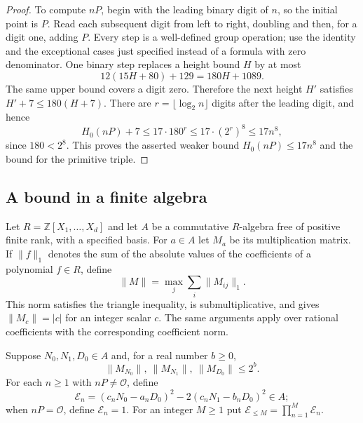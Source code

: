 \begin{proof}
To compute $nP$, begin with the leading binary digit of $n$, so the
initial point is $P$.  Read each subsequent digit from left to right,
doubling and then, for a digit one, adding $P$.  Every step is a
well-defined group operation; use the identity and the exceptional
cases just specified instead of a formula with zero denominator.
One binary step replaces a height bound $H$ by at most
\[
                     12(15H+80)+129=180H+1089.
\]
The same upper bound covers a digit zero.  Therefore the next height
$H'$ satisfies $H'+7\le180(H+7)$.  There are
$r=\lfloor\log_2 n\rfloor$ digits after the leading digit, and hence
\[
 H_0(nP)+7\le17\cdot180^r
       \le17\cdot(2^r)^8\le17n^8,
\]
since $180<2^8$.  This proves the asserted weaker bound
$H_0(nP)\le17n^8$ and the bound for the primitive triple.
\end{proof}

\subsection{A bound in a finite algebra}

Let $R=\mathbb Z[X_1,\ldots,X_d]$ and let $A$ be a commutative
$R$-algebra free of positive finite rank, with a specified basis.  For
$a\in A$ let $M_a$ be its multiplication matrix.  If
$\|f\|_1$ denotes the sum of the absolute values of the coefficients
of a polynomial $f\in R$, define
\[
              \|M\|=\max_j\sum_i\|M_{ij}\|_1.
\]
This norm satisfies the triangle inequality, is submultiplicative,
and gives $\|M_c\|=|c|$ for an integer scalar $c$.
The same arguments apply over rational coefficients with the
corresponding coefficient norm.

Suppose $N_0,N_1,D_0\in A$ and, for a real number $b\ge0$,
\[
        \|M_{N_0}\|,\ \|M_{N_1}\|,\ \|M_{D_0}\|\le2^b.
\]
For each $n\ge1$ with $nP\ne\mathcal O$, define
\[
 \mathcal E_n=(c_nN_0-a_nD_0)^2
                       -2(c_nN_1-b_nD_0)^2\in A;
\]
when $nP=\mathcal O$, define $\mathcal E_n=1$.  For an integer
$M\ge1$ put $\mathcal E_{\le M}=\prod_{n=1}^M\mathcal E_n$.

